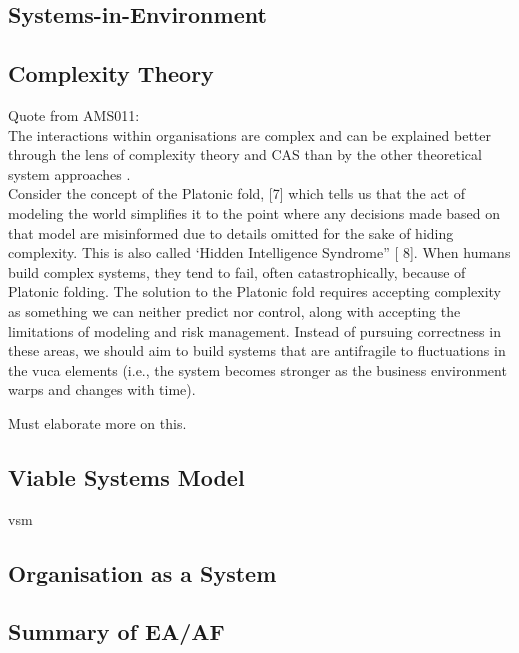 \subsection{Systems-in-Environment}

\parencite[p. 41]{Lapalme2012}

\subsection{Complexity Theory}
\label{sub:tbcomplexitytheory}
Quote from AMS011:\\
The interactions within organisations are complex and can be explained better through the lens of complexity theory and CAS than by the other theoretical system approaches \parencite[p. 15]{Turner2019}.\\

Consider the concept of the Platonic fold, [7] which tells us that the act of modeling the world
simplifies it to the point where any decisions made based on that model are misinformed due to details omitted for
the sake of hiding complexity. This is also called ‘Hidden Intelligence Syndrome” [ 8]. When humans build complex systems, they tend to fail, often catastrophically, because of Platonic folding. The
solution to the Platonic fold requires accepting complexity as something we can neither predict nor control, along
with accepting the limitations of modeling and risk management. Instead of pursuing correctness in these areas, we
should aim to build systems that are \gls{antifragile} to fluctuations in the \acrshort{vuca} elements (i.e., the system becomes
stronger as the business environment warps and changes with time). \parencite[p. 885]{OReilly2019}

\begin{remark}
	Must elaborate more on this.
\end{remark}

\subsection{Viable Systems Model}
\label{sub:tbvsm}
\acrfull{vsm}


\subsection{Organisation as a System}
\label{sub:tborganisation}

\subsection{Summary of EA/AF}
\label{sub:sfsummarysystemstheory}
